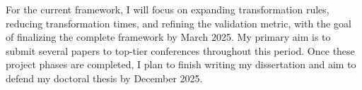 For the current framework, I will focus on expanding transformation rules, reducing transformation times, and refining the validation metric, with the goal of finalizing the complete framework by March 2025. My primary aim is to submit several papers to top-tier conferences throughout this period. Once these project phases are completed, I plan to finish writing my dissertation and aim to defend my doctoral thesis by December 2025.












